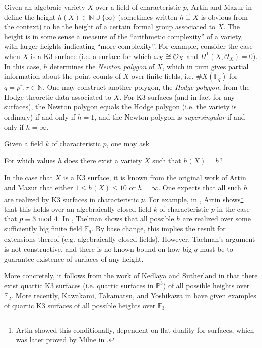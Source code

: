Given an algebraic variety \(X\) over a field of characteristic \(p\),
Artin and Mazur in \cite{artin-mazur-1977-height}
define the height \(h(X) \in \mathbb{N} \cup \{\infty\}\) 
(sometimes written \(h\) if \(X\) is obvious from the context)
to be the height 
of a certain formal group associated to \(X\).
The height is in some sense a measure of the
``arithmetic complexity'' of a variety,
with larger heights indicating ``more complexity''.
For example, consider the case when \(X\) is a 
K3 surface (i.e. a surface for which \(\omega_{X} \cong \mathcal{O}_{X} \) 
and \(H^{1}(X,\mathcal{O}_{X} ) = 0\)).
In this case, \(h\) determines the \textit{Newton polygon}
of \(X\), which in turn gives partial information about the 
point counts of \(X\) over finite fields,
i.e. \(\#X(\mathbb{F}_{q})\) for \(q = p^{r}, r \in \mathbb{N}\).
One may construct another polygon, the \textit{Hodge polygon},
from the Hodge-theoretic data associated to \(X\).
For K3 surfaces (and in fact for any surfaces), 
the Newton polygon equals the Hodge polygon
(i.e. the variety is ordinary) if and only if \(h=1\),
and the Newton polygon is \textit{supersingular} if and only if 
\(h = \infty\).

Given a field \(k\) of characteristic \(p\), one may ask

\begin{quest}
    For which values \(h\) does there exist a variety
    \(X\) such that \(h(X) = h\)?
\end{quest}

In the case that \(X\) is a K3 surface, it is known from the 
original work of Artin and Mazur
that either \(1 \leq h(X) \leq 10\) or \(h = \infty\).
One expects that all such $h$ are realized by K3 surfaces
in characteristic $p$.
For example, in \cite{artin-1974-k3-surfaces},
Artin shows\footnote{
    Artin showed this conditionally, dependent on flat
    duality for surfaces, which was later proved
    by Milne in \cite{milne-1976-flat-duality}.
}
that this holds over an algebraically
closed field \(k\) of characteristic \(p\) in the
case that \(p \equiv 3 \text{ mod } 4\).
In \cite{taelman-2016-k3-given-l-function}, 
Taelman shows that
all possible \(h\) are realized
over some sufficiently big finite field \(\mathbb{F}_{q}\). 
By base change, this implies the result for extensions
thereof (e.g. algebraically closed fields).
However, Taelman's argument is not constructive,
and there is no known bound on how big \(q\) must be to guarantee
existence of surfaces of any height.

More concretely, it follows from the work of
Kedlaya and Sutherland in 
\cite{kedlaya-sutherland-2016-census-k3-f2}
that there exist quartic K3 surfaces
(i.e. quartic surfaces in \(\mathbb{P}^{3}\))
of all possible heights over \(\mathbb{F}_{2}\).
More recently,
Kawakami, Takamatsu, and Yoshikawa in \cite{kty-2022-fedder}
have given examples of quartic K3 surfaces
of all possible heights over \(\mathbb{F}_{3}\).

